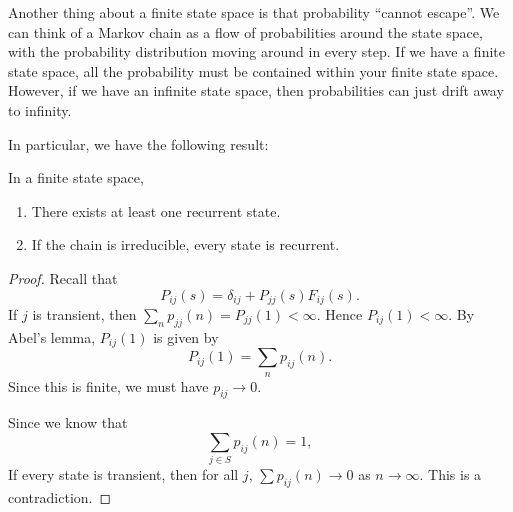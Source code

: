 \documentclass[a4paper]{article}
\begin{document}
Another thing about a finite state space is that probability ``cannot escape''. We can think of a Markov chain as a flow of probabilities around the state space, with the probability distribution moving around in every step. If we have a finite state space, all the probability must be contained within your finite state space. However, if we have an infinite state space, then probabilities can just drift away to infinity.

In particular, we have the following result:
\begin{thm}[]
  In a finite state space,
  \begin{enumerate}
    \item There exists at least one recurrent state.
    \item If the chain is irreducible, every state is recurrent.
  \end{enumerate}
\end{thm}

\begin{proof}
  Recall that
  \[
    P_{ij}(s) = \delta_{ij} + P_{jj}(s) F_{ij}(s).
  \]
  If $j$ is transient, then $\sum_n p_{jj}(n) = P_{jj}(1) < \infty$. Hence $P_{ij}(1) < \infty$. By Abel's lemma, $P_{ij}(1)$ is given by
  \[
    P_{ij}(1) = \sum_n p_{ij}(n).
  \]
  Since this is finite,  we must have $p_{ij}\to 0$.

  Since we know that
  \[
    \sum_{j\in S}p_{ij}(n) = 1,
  \]
  If every state is transient, then for all $j$, $\sum p_{ij}(n) \to 0$ as $n\to \infty$. This is a contradiction.
\end{proof}
\end{document}
